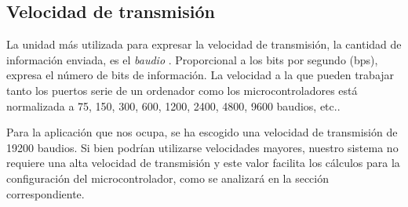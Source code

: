 \subsection{Velocidad de transmisión}

La unidad más utilizada para expresar la velocidad de transmisión, la cantidad de información enviada, es el \textit{baudio} \cite{baudio}. Proporcional a los bits por segundo (bps), expresa el número de bits de información. La velocidad a la que pueden trabajar tanto los puertos serie de un ordenador como los microcontroladores está normalizada a 75, 150, 300, 600, 1200, 2400, 4800, 9600 baudios, etc.\cite{pic_serie}.

Para la aplicación que nos ocupa, se ha escogido una velocidad de transmisión de 19200 baudios. Si bien podrían utilizarse velocidades mayores, nuestro sistema no requiere una alta velocidad de transmisión y este valor facilita los cálculos para la configuración del microcontrolador, como se analizará en la sección correspondiente.
